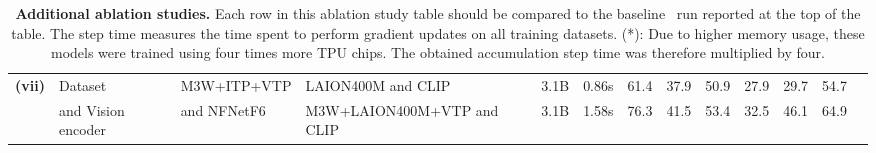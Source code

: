 \begin{table}[t]
{\begin{tabular}{@{}rlll|cc|ccccc|cc@{}}
\multirow{2}{*}{\textbf{(vii)}}& Dataset & M3W+ITP+VTP  & LAION400M and CLIP   &  3.1B & 0.86s   &  61.4  & 37.9  & 50.9  & 27.9 &  29.7 &  54.7  \\
& and Vision encoder & and NFNetF6 & M3W+LAION400M+VTP and CLIP                    &  3.1B & 1.58s   &  76.3  & 41.5  & 53.4  & 32.5 &  46.1  & 64.9 \\ \bottomrule
\end{tabular}%
}
\vspace{.5em}
\caption{\capfontsize{} \textbf{Additional ablation studies.} 
Each row in this ablation study table should be compared to the baseline~\method{} run reported at the top of the table.
The step time measures the time spent to perform gradient updates on all training datasets.
(*): Due to higher memory usage, these models were trained using four times more TPU chips. The obtained accumulation step time was therefore multiplied by four.
}
\label{tab:ablation-table-appendix}
\end{table}



